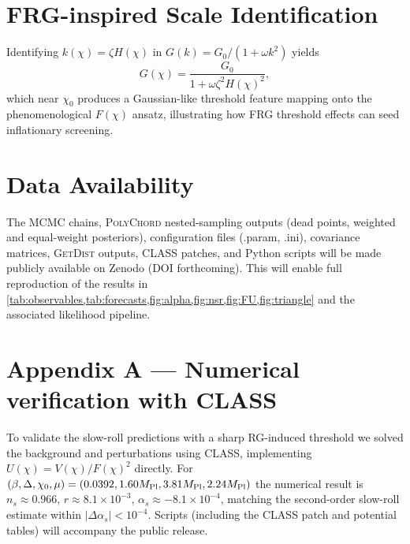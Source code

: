\documentclass[11pt,a4paper]{article}
\begin{document}
\section{FRG-inspired Scale Identification}
\label{sec:frg}
Identifying $k(\chi)=\zeta H(\chi)$ in $G(k)=G_{0}/(1+\omega k^{2})$ yields
\begin{equation}
G(\chi)=\frac{G_{0}}{1+\omega\zeta^{2}H(\chi)^{2}},
\end{equation}
which near $\chi_{0}$ produces a Gaussian-like threshold feature mapping onto the phenomenological $F(\chi)$ ansatz, illustrating how FRG threshold effects can seed inflationary screening.

\section{Data Availability}
\label{sec:data}
The MCMC chains, \textsc{PolyChord} nested-sampling outputs (dead points, weighted and equal-weight posteriors), configuration files (.param, .ini), covariance matrices, \textsc{GetDist} outputs, \textsc{CLASS} patches, and Python scripts will be made publicly available on Zenodo (DOI forthcoming). This will enable full reproduction of the results in \cref{tab:observables,tab:forecasts,fig:alpha,fig:nsr,fig:FU,fig:triangle} and the associated likelihood pipeline.

\appendix

\section{Appendix A --- Numerical verification with CLASS}
To validate the slow-roll predictions with a sharp RG-induced threshold we solved the background and perturbations using \textsc{CLASS}, implementing $U(\chi)=V(\chi)/F(\chi)^{2}$ directly. For $(\beta,\Delta,\chi_{0},\mu)=(0.0392,1.60M_{\rm Pl},3.81M_{\rm Pl},2.24M_{\rm Pl})$ the numerical result is $n_{s}\approx0.966$, $r\approx8.1\times10^{-3}$, $\alpha_{s}\approx-8.1\times10^{-4}$, matching the second-order slow-roll estimate within $|\Delta\alpha_{s}|<10^{-4}$. Scripts (including the \textsc{CLASS} patch and potential tables) will accompany the public release.
\end{document}
